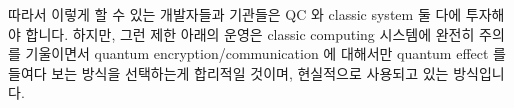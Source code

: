 따라서 이렇게 할 수 있는 개발자들과 기관들은 QC 와 classic system 둘 다에
투자해야 합니다.
하지만, 그런 제한 아래의 운영은 classic computing 시스템에 완전히 주의를
기울이면서 quantum encryption/communication 에 대해서만 quantum effect 를
들여다 보는 방식을 선택하는게 합리적일 것이며, 현실적으로 사용되고 있는
방식입니다.

